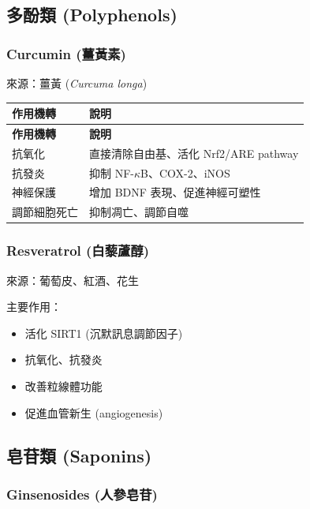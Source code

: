 \documentclass[12pt,a4paper]{article}
\begin{document}
\subsection{多酚類 (Polyphenols)}

\subsubsection{Curcumin (薑黃素)}

來源：薑黃 (\textit{Curcuma longa})

\begin{longtable}{p{4cm}p{10cm}}
\toprule
\textbf{作用機轉} & \textbf{說明} \\
\midrule
\endfirsthead
\toprule
\textbf{作用機轉} & \textbf{說明} \\
\midrule
\endhead
\bottomrule
\endfoot

抗氧化 & 直接清除自由基、活化 Nrf2/ARE pathway \\
\midrule
抗發炎 & 抑制 NF-$\kappa$B、COX-2、iNOS \\
\midrule
神經保護 & 增加 BDNF 表現、促進神經可塑性 \\
\midrule
調節細胞死亡 & 抑制凋亡、調節自噬 \\
\bottomrule
\end{longtable}


\subsubsection{Resveratrol (白藜蘆醇)}

來源：葡萄皮、紅酒、花生

主要作用：
\begin{itemize}
    \item 活化 SIRT1 (沉默訊息調節因子)
    \item 抗氧化、抗發炎
    \item 改善粒線體功能
    \item 促進血管新生 (angiogenesis)
\end{itemize}

\subsection{皂苷類 (Saponins)}

\subsubsection{Ginsenosides (人參皂苷)}
\end{document}
